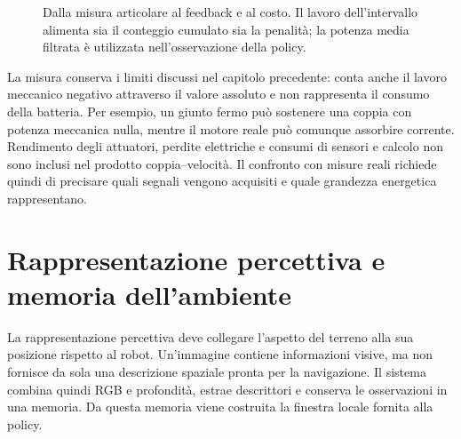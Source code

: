 \begin{figure}[tbp]
    \centering
    \caption[Calcolo e impiego del segnale energetico]{Dalla misura articolare al feedback e al costo. Il lavoro dell'intervallo alimenta sia il conteggio cumulato sia la penalità; la potenza media filtrata è utilizzata nell'osservazione della policy.}
    \label{fig:metodo-segnali-energetici}
\end{figure}

La misura conserva i limiti discussi nel capitolo precedente: conta anche il lavoro meccanico negativo attraverso il valore assoluto e non rappresenta il consumo della batteria. Per esempio, un giunto fermo può sostenere una coppia con potenza meccanica nulla, mentre il motore reale può comunque assorbire corrente. Rendimento degli attuatori, perdite elettriche e consumi di sensori e calcolo non sono inclusi nel prodotto coppia--velocità. Il confronto con misure reali richiede quindi di precisare quali segnali vengono acquisiti e quale grandezza energetica rappresentano.

\section{Rappresentazione percettiva e memoria dell'ambiente}
\label{sec:metodo-percezione}

La rappresentazione percettiva deve collegare l'aspetto del terreno alla sua posizione rispetto al robot. Un'immagine contiene informazioni visive, ma non fornisce da sola una descrizione spaziale pronta per la navigazione. Il sistema combina quindi RGB e profondità, estrae descrittori e conserva le osservazioni in una memoria. Da questa memoria viene costruita la finestra locale fornita alla policy.

